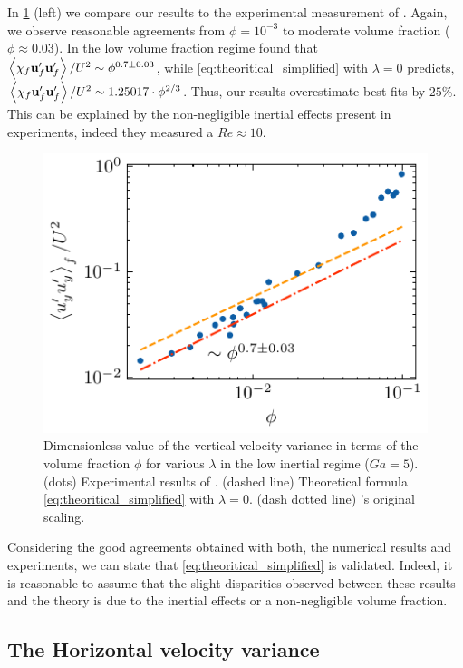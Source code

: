 In \ref{fig:uuyy2} (left) we compare our results to the  experimental measurement of \citet{cartellier2009induced}. 
Again, we observe reasonable agreements from $\phi = 10^{-3}$ to moderate volume fraction ($\phi \approx 0.03$). 
In the low volume fraction regime \citet{cartellier2009induced} found that $\left<\chi_f\textbf{u}_f'\textbf{u}_f'\right> / U^2 \sim \phi^{0.7 \pm 0.03}$,  while \ref{eq:theoritical_simplified} with $\lambda = 0$ predicts, $\left<\chi_f\textbf{u}_f'\textbf{u}_f'\right> / U^2 \sim 1.25017 \cdot \phi^{2/3} $. 
Thus, our results overestimate \citet{cartellier2009induced} best fits by $25\%$. 
This can be explained by the non-negligible inertial effects present in \citet{cartellier2009induced} experiments, indeed they measured a $Re \approx 10$. 
\begin{figure}
    \centering
    \includegraphics[height = 0.25\textwidth]{image/HOMOGENEOUS_final/CA/cartellier.pdf}
    \caption{Dimensionless value of the vertical velocity variance  in terms of the volume fraction $\phi$ for various $\lambda$ in the low inertial regime ($Ga = 5$). 
    (dots) Experimental  results  of \citet{cartellier2009induced}.
    (dashed line) Theoretical formula \ref{eq:theoritical_simplified} with $\lambda = 0$.
    (dash dotted line) \citet{cartellier2009induced}'s original scaling. 
    }
    \label{fig:uuyy2}
\end{figure}

Considering the good agreements obtained with both, the numerical results and \citet{cartellier2009induced} experiments, we can state that \ref{eq:theoritical_simplified} is validated. 
Indeed, it is reasonable to assume that the slight disparities observed between these results and the theory is due to the inertial effects or a non-negligible volume fraction. 

\subsection{The Horizontal velocity variance}

